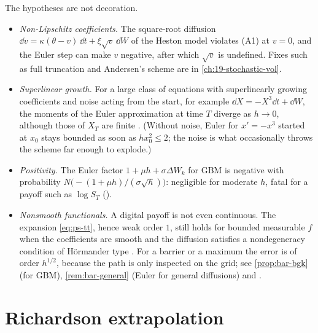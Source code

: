 \begin{remark}\label{rem:ps-failures}
The hypotheses are not decoration.
\begin{itemize}
  \item \emph{Non-Lipschitz coefficients.} The square-root diffusion
    $\dd v=\kappa(\theta-v)\,\dd t+\xi\sqrt v\,\dd W$ of the Heston model violates (A1) at
    $v=0$, and the Euler step can make $v$ negative, after which $\sqrt v$ is undefined.
    Fixes such as full truncation and Andersen's scheme are in \cref{ch:19-stochastic-vol}.
  \item \emph{Superlinear growth.} For a large class of equations with superlinearly
    growing coefficients and noise acting from the start, for example
    $\dd X=-X^3\dd t+\dd W$, the moments of the Euler approximation at time $T$ diverge as
    $h\to0$, although those of $X_T$ are finite \citep{hutzenthaler-jentzen-kloeden}. (Without
    noise, Euler for $x'=-x^3$ started at $x_0$ stays bounded as soon as $hx_0^2\le2$; the
    noise is what occasionally throws the scheme far enough to explode.)
  \item \emph{Positivity.} The Euler factor $1+\mu h+\sigma\Delta W_k$ for GBM is negative
    with probability $N\big(-(1+\mu h)/(\sigma\sqrt h)\big)$: negligible for moderate $h$,
    fatal for a payoff such as $\log S_T$ ().
  \item \emph{Nonsmooth functionals.} A digital payoff is not even continuous. The expansion
    \eqref{eq:ps-tt}, hence weak order $1$, still holds for bounded measurable $f$ when the
    coefficients are smooth and the diffusion satisfies a nondegeneracy condition of
    H\"ormander type \citep{bally-talay}. For a barrier or a maximum the error is of order $h^{1/2}$, because
    the path is only inspected on the grid; see \cref{prop:bar-bgk} (for GBM), \cref{rem:bar-general} (Euler for general diffusions) and
    .
\end{itemize}
\end{remark}


\section{Richardson extrapolation}\label{sec:ps-richardson}

